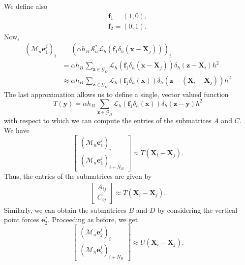 \documentclass[preprint,12pt]{elsarticle}
\begin{document}
We define also
\begin{gather}
\mathbf{f}_1 = (1,0), \\
\mathbf{f}_2 = (0,1).
\end{gather}
Now,
\begin{align}
(\mathcal{M}_n\mathbf{e}_1^j)_i &=
\left( \alpha  h_B \,  \mathcal{S}^*_n \mathcal{L}_h  \left( \mathbf{f}_1 \delta_h (\mathbf{x}-\mathbf{X}_j) \right) \right)_i\\
&=  \alpha h_B  \, \sum_{\mathbf{z} \in \mathcal{G}_\Omega} \mathcal{L}_h  \left( \mathbf{f}_1 \delta_h (\mathbf{x}-\mathbf{X}_j) \right) \delta_h(\mathbf{z}-\mathbf{X}_i)h^2 \\
& \approx  \alpha h_B  \, \sum_{\mathbf{z} \in \mathcal{G}_\Omega} \mathcal{L}_h  \left( \mathbf{f}_1 \delta_h (\mathbf{x}) \right) \delta_h\left(\mathbf{z}-(\mathbf{X}_i-\mathbf{X}_j)\right)h^2
\end{align}
The last approximation allows us to define a single, vector valued function
\begin{equation}
T(\mathbf{y}) =  \alpha h_B \, \sum_{\mathbf{z} \in \mathcal{G}_\Omega} \mathcal{L}_h  \left( \mathbf{f}_1 \delta_h (\mathbf{x}) \right) \delta_h\left(\mathbf{z}-\mathbf{y}\right)h^2
\end{equation}
with respect to which we can compute the entries of the submatrices $A$ and $C$. We have
\begin{equation}
\begin{bmatrix} 
(\mathcal{M}_n\mathbf{e}_1^j)_i \\
(\mathcal{M}_n\mathbf{e}_1^j)_{i+N_B}
\end{bmatrix} \approx
T(\mathbf{X}_i-\mathbf{X}_j).
\end{equation}
Thus, the entries of the submatrices are given by
\begin{align}
\begin{bmatrix} A_{ij} \\ C_{ij} \end{bmatrix}
\approx T(\mathbf{X}_i-\mathbf{X}_j).
\end{align}
Similarly, we can obtain the submatrices  $B$ and $D$ by considering the vertical point forces $\mathbf{e}^j_2$. 
Proceeding as before, we get
\begin{equation}
\begin{bmatrix} 
(\mathcal{M}_n\mathbf{e}_2^j)_i \\
(\mathcal{M}_n\mathbf{e}_2^j)_{i+N_B}
\end{bmatrix} \approx
U(\mathbf{X}_i-\mathbf{X}_j).
\end{equation}
\end{document}
